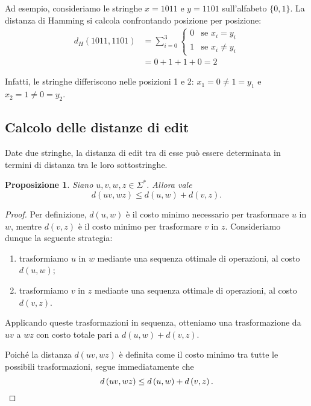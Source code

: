 \documentclass[a4paper,12pt]{report}
\theoremstyle{propositionstyle}
\newtheorem{prop}{Proposizione}[chapter]
\begin{document}
    Ad esempio, consideriamo le stringhe $x = 1011$ e $y = 1101$ sull'alfabeto $\{0, 1\}$. La distanza di Hamming si calcola confrontando posizione per posizione:
    \begin{align*}
        d_H(1011, 1101) &= \sum_{i=0}^{3} \begin{cases}
            0 & \text{se } x_i = y_i \\
            1 & \text{se } x_i \neq y_i
        \end{cases} \\
        &= 0 + 1 + 1 + 0 = 2
    \end{align*}
    
    Infatti, le stringhe differiscono nelle posizioni 1 e 2: $x_1 = 0 \neq 1 = y_1$ e $x_2 = 1 \neq 0 = y_2$.

    \subsection{Calcolo delle distanze di edit}

    Date due stringhe, la distanza di edit tra di esse può essere determinata in termini di distanza tra le loro sottostringhe.

\begin{prop}
    Siano $u,v,w,z \in \Sigma^*$. Allora vale
    \[
        d\left(uv, wz\right) \leq d\left(u,w\right) + d\left(v,z\right).
    \]
\end{prop}

\begin{proof}
    Per definizione, $d\left(u,w\right)$ è il costo minimo necessario per trasformare $u$ in $w$, mentre $d\left(v,z\right)$ è il costo minimo per trasformare $v$ in $z$.
    Consideriamo dunque la seguente strategia:
    \begin{enumerate}
        \item trasformiamo $u$ in $w$ mediante una sequenza ottimale di operazioni, al costo $d\left(u,w\right)$;
        \item trasformiamo $v$ in $z$ mediante una sequenza ottimale di operazioni, al costo $d\left(v,z\right)$.
    \end{enumerate}
    Applicando queste trasformazioni in sequenza, otteniamo una trasformazione da $uv$ a $wz$ con costo totale pari a $d\left(u,w\right)+d\left(v,z\right)$.

    Poiché la distanza $d\left(uv,wz\right)$ è definita come il costo minimo tra tutte le possibili trasformazioni, segue immediatamente che
    \[
        d\left(uv, wz\right) \leq d\left(u,w\right) + d\left(v,z\right). \qedhere
    \]
\end{proof}
\end{document}

